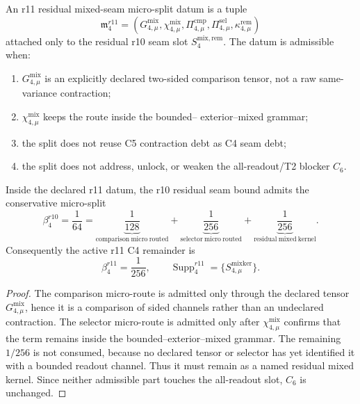 \begin{definition}
\label{def:v470-r11-residual-microsplit-datum}
An r11 residual mixed-seam micro-split datum is a tuple
\[
\mathfrak m_4^{r11}
=
(G_{4,\mu}^{\mathrm{mix}},\chi_{4,\mu}^{\mathrm{mix}},
 \Pi_{4,\mu}^{\mathrm{cmp}},\Pi_{4,\mu}^{\mathrm{sel}},
 \kappa_{4,\mu}^{\mathrm{rem}})
\]
attached only to the residual r10 seam slot
\(S_4^{\mathrm{mix,rem}}\).  The datum is admissible when:
\begin{enumerate}[label=(\roman*)]
\item \(G_{4,\mu}^{\mathrm{mix}}\) is an explicitly declared two-sided
      comparison tensor, not a raw same-variance contraction;
\item \(\chi_{4,\mu}^{\mathrm{mix}}\) keeps the route inside the bounded--
      exterior--mixed grammar;
\item the split does not reuse C5 contraction debt as C4 seam debt;
\item the split does not address, unlock, or weaken the all-readout/T2 blocker
      \(C_6\).
\end{enumerate}
\end{definition}

\begin{proposition}
\label{prop:v470-r11-residual-mixed-seam-microsplit}
Inside the declared r11 datum, the r10 residual seam bound admits the conservative
micro-split
\[
\beta_4^{r10}
=
\frac1{64}
=
\underbrace{\frac1{128}}_{\mathrm{comparison\ micro\ routed}}
+
\underbrace{\frac1{256}}_{\mathrm{selector\ micro\ routed}}
+
\underbrace{\frac1{256}}_{\mathrm{residual\ mixed\ kernel}}.
\]
Consequently the active r11 C4 remainder is
\[
\beta_4^{r11}=\frac1{256},
\qquad
\operatorname{Supp}_4^{r11}=\{S_{4,\mu}^{\mathrm{mixker}}\}.
\]
\end{proposition}

\begin{proof}
The comparison micro-route is admitted only through the declared tensor
\(G_{4,\mu}^{\mathrm{mix}}\), hence it is a comparison of sided channels rather
than an undeclared contraction.  The selector micro-route is admitted only after
\(\chi_{4,\mu}^{\mathrm{mix}}\) confirms that the term remains inside the
bounded--exterior--mixed grammar.  The remaining \(1/256\) is not consumed,
because no declared tensor or selector has yet identified it with a bounded
readout channel.  Thus it must remain as a named residual mixed kernel.  Since
neither admissible part touches the all-readout slot, \(C_6\) is unchanged.
\end{proof}

